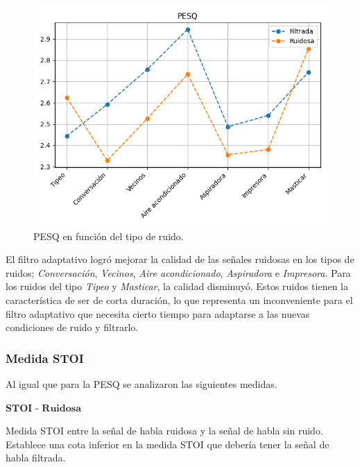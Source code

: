 \begin{figure}
	\centering
	\centerline{\includegraphics[scale=0.75]{images/ch6/pesq_by_noise_type.png}}
	\caption{PESQ en función del tipo de ruido.}
	\label{fig:ch6_pesq_by_noise_type}
\end{figure} 


El filtro adaptativo logró mejorar la calidad de las señales ruidosas en los tipos de ruidos; \emph{Conversación}, \emph{Vecinos}, \emph{Aire acondicionado}, \emph{Aspiradora} e \emph{Impresora}. Para los ruidos del tipo \emph{Tipeo} y \emph{Masticar}, la calidad disminuyó. Estos ruidos tienen la característica de ser de corta duración, lo que representa un inconveniente para el filtro adaptativo que necesita cierto tiempo para adaptarse a las nuevas condiciones de ruido y filtrarlo.

\subsubsection{Medida STOI}

Al igual que para la PESQ se analizaron las siguientes medidas.

\vspace{5mm}

\noindent $\textbf{STOI - Ruidosa}$

\vspace{5mm}

Medida STOI entre la señal de habla ruidosa y la señal de habla sin ruido. Establece una cota inferior en la medida STOI que debería tener la señal de habla filtrada.

